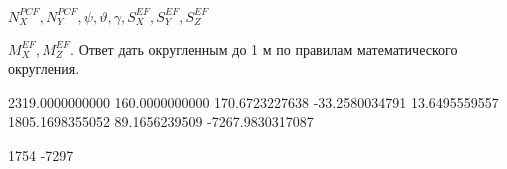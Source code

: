 $N_X^{PCF}, N_Y^{PCF}, \psi, \vartheta, \gamma, S_X^{EF}, S_Y^{EF}, S_Z^{EF}$ 

\outputfmtSection

$M_X^{EF}, M_Z^{EF}$. Ответ дать округленным до 1 м по правилам математического округления.

\begin{myverbbox}[\small]{\vinput}
    2319.0000000000 160.0000000000 170.6723227638 -33.2580034791 
    13.6495559557 1805.1698355052 89.1656239509 -7267.9830317087
\end{myverbbox}
\begin{myverbbox}[\small]{\voutput}
    1754 -7297
\end{myverbbox}

